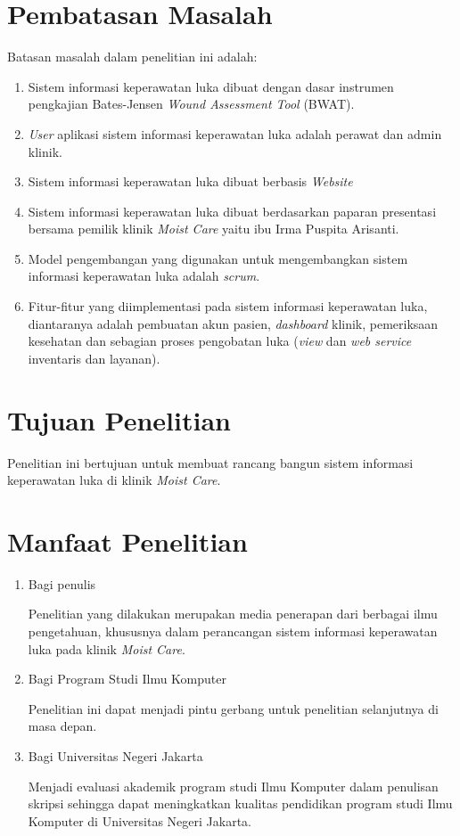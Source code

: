 \section{Pembatasan Masalah}
Batasan masalah dalam penelitian ini adalah:

\begin{enumerate}
	\item Sistem informasi keperawatan luka dibuat dengan dasar instrumen pengkajian Bates-Jensen \emph{Wound Assessment Tool} (BWAT).
	
	\item \emph{User} aplikasi sistem informasi keperawatan luka adalah perawat dan admin klinik.
	
	\item Sistem informasi keperawatan luka dibuat berbasis \emph{Website}
	
	\item Sistem informasi keperawatan luka dibuat berdasarkan paparan presentasi bersama pemilik klinik \emph{Moist Care} yaitu ibu Irma Puspita Arisanti.
	
	\item Model pengembangan yang digunakan untuk mengembangkan sistem informasi keperawatan luka adalah \emph{scrum}.
	
	\item Fitur-fitur yang diimplementasi pada sistem informasi keperawatan luka, diantaranya adalah pembuatan akun pasien, \emph{dashboard} klinik, pemeriksaan kesehatan dan sebagian proses pengobatan luka (\emph{view} dan \emph{web service} inventaris dan layanan).
	
\end{enumerate}

\section{Tujuan Penelitian}
Penelitian ini bertujuan untuk membuat rancang bangun sistem informasi keperawatan luka di klinik \emph{Moist Care}.

\section{Manfaat Penelitian}
\begin{enumerate}
	\item Bagi penulis
	
	Penelitian yang dilakukan merupakan media penerapan dari berbagai ilmu pengetahuan, khususnya dalam perancangan sistem informasi keperawatan luka pada klinik \emph{Moist Care}.
	
	\item Bagi Program Studi Ilmu Komputer
	
	Penelitian ini dapat menjadi pintu gerbang untuk penelitian selanjutnya di masa depan.
	
	\item Bagi Universitas Negeri Jakarta
	
	Menjadi evaluasi akademik program studi Ilmu Komputer dalam penulisan skripsi sehingga dapat meningkatkan kualitas pendidikan program studi Ilmu Komputer di Universitas Negeri Jakarta.
	
\end{enumerate}

\begin{comment}

\end{comment}
